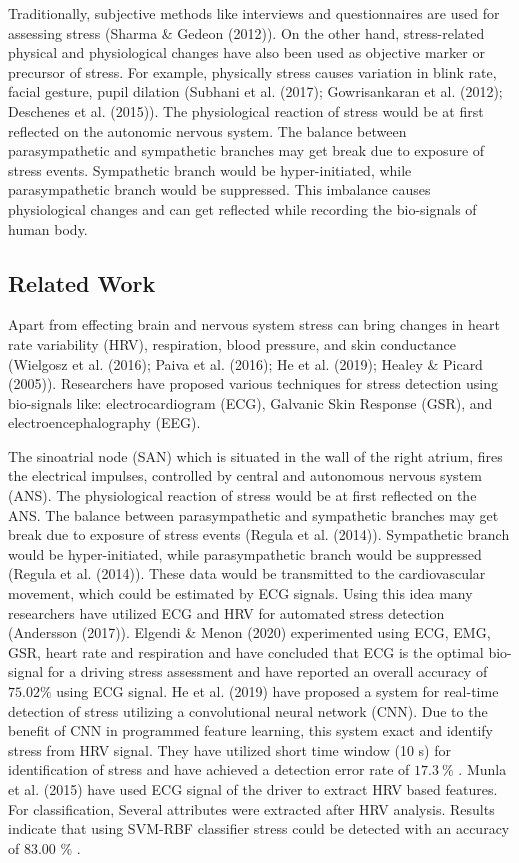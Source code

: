 Traditionally, subjective methods like interviews and questionnaires are used for assessing stress (Sharma \& Gedeon (2012)). On the other hand, stress-related physical and physiological changes have also been used as objective marker or precursor of stress. For example, physically stress causes variation in blink rate, facial gesture, pupil dilation (Subhani et al. (2017); Gowrisankaran et al. (2012); Deschenes et al. (2015)). The physiological reaction of stress would be at first reflected on the autonomic nervous system. The balance between parasympathetic and sympathetic branches may get break due to exposure of stress events. Sympathetic branch would be hyper-initiated, while parasympathetic branch would be suppressed. This imbalance causes physiological changes and can get reflected while recording the bio-signals of human body.

\subsection{Related Work}

Apart from effecting brain and nervous system stress can bring changes in heart rate variability (HRV), respiration, blood pressure, and skin conductance (Wielgosz et al. (2016); Paiva et al. (2016); He et al. (2019); Healey \& Picard (2005)). Researchers have proposed various techniques for stress detection using bio-signals like: electrocardiogram (ECG), Galvanic Skin Response (GSR), and electroencephalography (EEG).

The sinoatrial node (SAN) which is situated in the wall of the right atrium, fires the electrical impulses, controlled by central and autonomous nervous system (ANS). The physiological reaction of stress would be at first reflected on the ANS. The balance between parasympathetic and sympathetic branches may get break due to exposure of stress events (Regula et al. (2014)). Sympathetic branch would be hyper-initiated, while parasympathetic branch would be suppressed (Regula et al. (2014)). These data would be transmitted to the cardiovascular movement, which could be estimated by ECG signals. Using this idea many researchers have utilized ECG and HRV for automated stress detection (Andersson (2017)). Elgendi \& Menon (2020) experimented using ECG, EMG, GSR, heart rate and respiration and have concluded that ECG is the optimal bio-signal for a driving stress assessment and have reported an overall accuracy of $75.02\%$ using ECG signal. He et al. (2019) have proposed a system for real-time detection of stress utilizing a convolutional neural network (CNN). Due to the benefit of CNN in programmed feature learning, this system exact and identify stress from HRV signal. They have utilized short time window (10 s) for identification of stress and have achieved a detection error rate of $17.3~\%$ . Munla et al. (2015) have used ECG signal of the driver to extract HRV based features. For classification, Several attributes were extracted after HRV analysis. Results indicate that using SVM-RBF classifier stress could be detected with an accuracy of 83.00 $\%$ .

